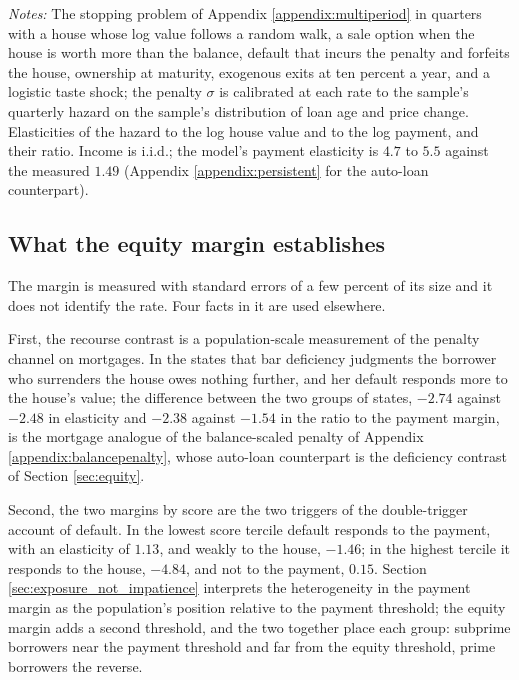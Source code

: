 \begin{table}[H]
\centering
\caption{The model's equity margin on a grid of discount rates}
\label{tab:equity_model}
\small

\vspace{0.5em}
\begin{minipage}{0.92\textwidth}
\noindent \small \textit{Notes:} The stopping problem of Appendix \ref{appendix:multiperiod} in quarters with a house whose log value follows a random walk, a sale option when the house is worth more than the balance, default that incurs the penalty and forfeits the house, ownership at maturity, exogenous exits at ten percent a year, and a logistic taste shock; the penalty $\sigma$ is calibrated at each rate to the sample's quarterly hazard on the sample's distribution of loan age and price change. Elasticities of the hazard to the log house value and to the log payment, and their ratio. Income is i.i.d.; the model's payment elasticity is $4.7$ to $5.5$ against the measured $1.49$ (Appendix \ref{appendix:persistent} for the auto-loan counterpart).
\end{minipage}
\end{table}

\subsection{What the equity margin establishes}

The margin is measured with standard errors of a few percent of its size and it does not identify the rate. Four facts in it are used elsewhere.

First, the recourse contrast is a population-scale measurement of the penalty channel on mortgages. In the states that bar deficiency judgments the borrower who surrenders the house owes nothing further, and her default responds more to the house's value; the difference between the two groups of states, $-2.74$ against $-2.48$ in elasticity and $-2.38$ against $-1.54$ in the ratio to the payment margin, is the mortgage analogue of the balance-scaled penalty of Appendix \ref{appendix:balancepenalty}, whose auto-loan counterpart is the deficiency contrast of Section \ref{sec:equity}.

Second, the two margins by score are the two triggers of the double-trigger account of default. In the lowest score tercile default responds to the payment, with an elasticity of $1.13$, and weakly to the house, $-1.46$; in the highest tercile it responds to the house, $-4.84$, and not to the payment, $0.15$. Section \ref{sec:exposure_not_impatience} interprets the heterogeneity in the payment margin as the population's position relative to the payment threshold; the equity margin adds a second threshold, and the two together place each group: subprime borrowers near the payment threshold and far from the equity threshold, prime borrowers the reverse.

